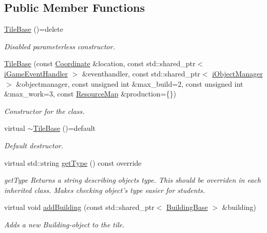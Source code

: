 \subsection*{Public Member Functions}
\begin{DoxyCompactItemize}
\item 
\hyperlink{classCourse_1_1TileBase_a6386bf6bc05528b4337dee65f6286e06}{Tile\-Base} ()=delete
\begin{DoxyCompactList}\small\item\em Disabled parameterless constructor. \end{DoxyCompactList}\item 
\hyperlink{classCourse_1_1TileBase_ac1de1c7a0540691ef5a5c3321d12b708}{Tile\-Base} (const \hyperlink{classCourse_1_1Coordinate}{Coordinate} \&location, const std\-::shared\-\_\-ptr$<$ \hyperlink{classCourse_1_1iGameEventHandler}{i\-Game\-Event\-Handler} $>$ \&eventhandler, const std\-::shared\-\_\-ptr$<$ \hyperlink{classCourse_1_1iObjectManager}{i\-Object\-Manager} $>$ \&objectmanager, const unsigned int \&max\-\_\-build=2, const unsigned int \&max\-\_\-work=3, const \hyperlink{namespaceCourse_ab9a46ed9cd00485e318e5731ea2f78d9}{Resource\-Map} \&production=\{\})
\begin{DoxyCompactList}\small\item\em Constructor for the class. \end{DoxyCompactList}\item 
virtual \hyperlink{classCourse_1_1TileBase_a821db6b529d987eac53a958084fe2d5c}{$\sim$\-Tile\-Base} ()=default
\begin{DoxyCompactList}\small\item\em Default destructor. \end{DoxyCompactList}\item 
virtual std\-::string \hyperlink{classCourse_1_1TileBase_af1a8aaa3407ad3ade7ffe8f2fb421288}{get\-Type} () const override
\begin{DoxyCompactList}\small\item\em get\-Type Returns a string describing objects type. This should be overriden in each inherited class. Makes checking object's type easier for students. \end{DoxyCompactList}\item 
virtual void \hyperlink{classCourse_1_1TileBase_add69a1e9ec009dedb28ce54c8535370b}{add\-Building} (const std\-::shared\-\_\-ptr$<$ \hyperlink{classCourse_1_1BuildingBase}{Building\-Base} $>$ \&building)
\begin{DoxyCompactList}\small\item\em Adds a new Building-\/object to the tile. \end{DoxyCompactList}\item 

\end{DoxyCompactItemize}
